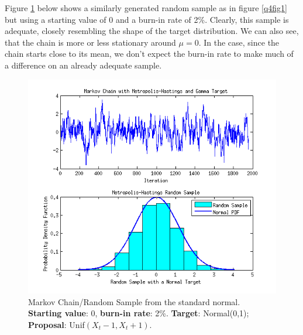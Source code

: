 \documentclass[12pt,a4paper]{article}
\begin{document}
Figure \ref{q4fig3} below shows a similarly generated random sample as in figure \ref{q4fig1} but using a starting value of 0 and a burn-in rate of 2\%. Clearly, this sample is adequate, closely resembling the shape of the target distribution. We can also see, that the chain is more or less stationary around $\mu=0$. In the case, since the chain starts close to its mean, we don't expect the burn-in rate to make much of a difference on an already adequate sample.
\begin{figure}[ht!] 
\begin{center}
\includegraphics[scale=.95]{graph7.png}
\caption{Markov Chain/Random Sample from the standard normal. \textbf{Starting value}: 0, \textbf{burn-in rate}: 2\%. \textbf{Target}: Normal(0,1); \textbf{Proposal}: Unif$(X_t-1,X_t+1)$.}
\label{q4fig3}
\end{center}
\end{figure}
\FloatBarrier
\clearpage
\end{document}
